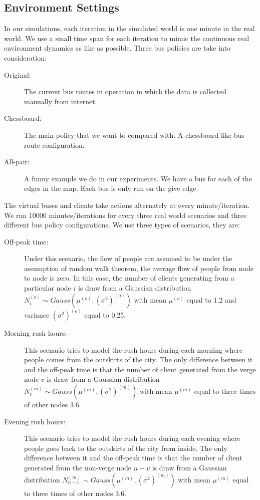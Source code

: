 \documentclass{sig-alternate}
\begin{document}
\subsection{Environment Settings}
In our simulations, each iteration in the simulated world is one minute in the real world. We use a small time span for each iteration to mimic the continuous real environment dynamics as like as possible.
Three bus policies are take into consideration:
\begin{description}
\item[Original:] The current bus routes in operation in which the data is collected manually from internet.
\item[Chessboard:] The main policy that we want to compared with. A chessboard-like bus route configuration.
\item[All-pair:] A funny example we do in our experiments. We have a bus for each of the edges in the map. Each bus is only run on the give edge.
\end{description}
The virtual buses and clients take actions alternately at every minute/iteration.
We run 10000 minutes/iterations for every three real world scenarios and three different bus policy configurations.
We use three types of scenarios, they are: 
\begin{description}
\item [Off-peak time:] Under this scenario, the flow of people are assumed to be under the assumption of random walk theorem, the average flow of people from node to node is zero. In this case, the number of clients generating from a particular node $i$ is draw from a Gaussian distribution $N_{i}^{(o)} \sim Gauss(\mu^{(o)},(\sigma^2)^{(o)})$ with mean $\mu^{(o)}$ equal to 1.2 and variance $(\sigma^2)^{(o)}$ equal to 0.25.
\item [Morning rush hours:] This scenario tries to model the rush hours during each morning where people comes from the outskirts of the city. The only difference between it and the off-peak time is that the number of client generated from the verge node $v$ is draw from a Gaussian distribution $N_{v}^{(m)} \sim Gauss(\mu^{(m)},(\sigma^2)^{(m)})$ with mean $\mu^{(m)}$ equal to three times of other nodes 3.6.
\item [Evening rush hours:] This scenario tries to model the rush hours during each evening where people goes back to the outskirts of the city from inside. The only difference between it and the off-peak time is that the number of client generated from the non-verge node $n-v$ is draw from a Gaussian distribution $N_{n-v}^{(m)} \sim Gauss(\mu^{(m)},(\sigma^2)^{(m)})$ with mean $\mu^{(m)}$ equal to three times of other nodes 3.6.
\end{description} 
\end{document}
